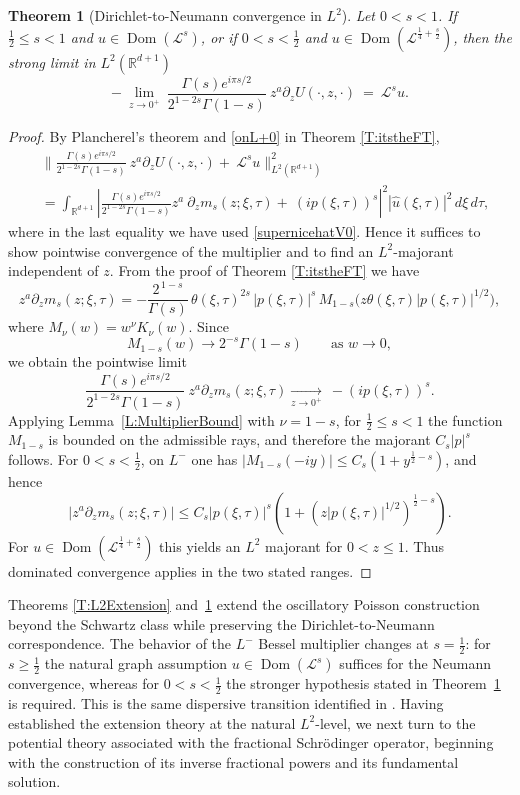 \documentclass[11pt,letter]{amsart}
\def \RNu {\mathbb{R}^{d+1}}
\newcommand{\p}{\partial}
\numberwithin{equation}{section}
\newcommand{\Le}{\mathcal L}
\newcommand{\Dom}{\operatorname{Dom}}
\newtheorem{theorem}{Theorem}[section]
\numberwithin{equation}{section}
\begin{document}
\begin{theorem}[Dirichlet-to-Neumann convergence in $L^2$]\label{T:DtNL2}
Let $0<s<1$. If $\frac12\le s<1$ and $u\in \Dom(\Le^s)$, or if $0<s<\frac12$ and $u\in \Dom(\Le^{\frac14+\frac s2})$, then the strong limit in $L^2(\RNu)$
\begin{equation}\label{des}
-\ \underset{z\to 0^+}{\lim}\ \frac{\Gamma(s)e^{i\pi s/2}}{2^{1-2s}\Gamma(1-s)} \ z^a \p_z U(\cdot,z,\cdot)\ =\  
\Le^s u.
\end{equation}
\end{theorem}

\begin{proof}
By Plancherel's theorem and \eqref{onL+0} in Theorem \ref{T:itstheFT}, 
\begin{align*}
& \bigl\|\frac{\Gamma(s)e^{i\pi s/2}}{2^{1-2s}\Gamma(1-s)} \ z^a \p_z U(\cdot,z,\cdot)
+\ \Le^su
\bigr\|_{L^2(\RNu)}^2
\\
& =
\int_{\RNu}
\left|
\frac{\Gamma(s)e^{i\pi s/2}}{2^{1-2s}\Gamma(1-s)} z^a\ \p_z m_s(z;\xi,\tau)
+\ (ip(\xi,\tau))^s
\right|^2
|\widehat u(\xi,\tau)|^2\,d\xi\,d\tau,
\end{align*}
where in the last equality we have used \eqref{supernicehatV0}.
Hence it suffices to show pointwise convergence of the multiplier and to
find an \(L^2\)-majorant independent of \(z\).
From the proof of Theorem \ref{T:itstheFT} we have
\[
z^a\partial_z m_s(z;\xi,\tau)
=
-\frac{2^{\,1-s}}{\Gamma(s)}\,
\theta(\xi,\tau)^{2s}\,
|p(\xi,\tau)|^s\,
M_{1-s}\!\bigl(z\theta(\xi,\tau)|p(\xi,\tau)|^{1/2}\bigr),
\]
where \(M_\nu(w)=w^\nu K_\nu(w)\). Since
\[
M_{1-s}(w)\longrightarrow 2^{-s}\Gamma(1-s)
\qquad\text{as }w\to0,
\]
we obtain the pointwise limit
\[
\frac{\Gamma(s)e^{i\pi s/2}}{2^{1-2s}\Gamma(1-s)}\ z^a\partial_z m_s(z;\xi,\tau)
\underset{z\to 0^+}{\longrightarrow}\ 
- (ip(\xi,\tau))^s.
\]
Applying Lemma~\ref{L:MultiplierBound} with $\nu=1-s$, for $\frac12\le s<1$ the function $M_{1-s}$ is bounded on the admissible rays,
and therefore the majorant $C_s|p|^s$ follows. For $0<s<\frac12$, on $L^-$ one has
$|M_{1-s}(-iy)|\le C_s(1+y^{\frac12-s})$, and hence
\[
|z^a\partial_z m_s(z;\xi,\tau)|\le C_s|p(\xi,\tau)|^s\left(1+(z|p(\xi,\tau)|^{1/2})^{\frac12-s}\right).
\]
For $u\in\Dom(\Le^{\frac14+\frac s2})$ this yields an $L^2$ majorant for $0<z\le1$.
Thus dominated convergence applies in the two stated ranges.

\end{proof}


Theorems \ref{T:L2Extension} and~\ref{T:DtNL2} extend the oscillatory
Poisson construction beyond the Schwartz class while preserving the
Dirichlet-to-Neumann correspondence. The behavior of the $L^-$ Bessel multiplier
changes at $s=\frac12$: for $s\ge\frac12$ the natural graph assumption
$u\in\Dom(\Le^s)$ suffices for the Neumann convergence, whereas for
$0<s<\frac12$ the stronger hypothesis stated in Theorem~\ref{T:DtNL2} is
required. This is the same dispersive transition identified in
\cite{GS1,GS2}. Having established the extension theory at the
natural $L^2$-level, we next turn to the potential theory associated
with the fractional Schr\"odinger operator, beginning with the
construction of its inverse fractional powers and its fundamental
solution.
\end{document}
